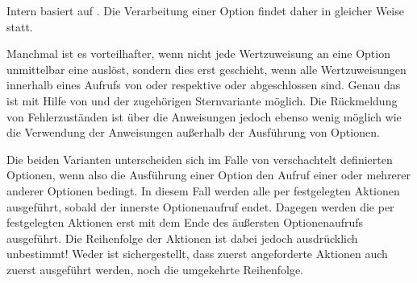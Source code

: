 \iffalse%
Die\ChangedAt{v3.27}{\Package{scrbase}} Verarbeitung einer Option
\Option{@else@} findet in derselben Weise statt wie bei
\DescRef{\LabelBase.cmd.FamilyOptions}.%
\else%
Intern basiert  auf
.
Die Verarbeitung einer Option
 findet daher in gleicher Weise statt.%
\fi%
\EndIndexGroup


\begin{Declaration}
\end{Declaration}
Manchmal ist es vorteilhafter, wenn nicht
jede Wertzuweisung an eine Option unmittelbar eine  auslöst,
sondern dies erst geschieht, wenn alle Wertzuweisungen innerhalb eines Aufrufs
von
oder
respektive  oder
 abgeschlossen
sind. Genau das ist mit Hilfe von  und der
zugehörigen Sternvariante möglich. Die
Rückmeldung von Fehlerzuständen ist über die Anweisungen jedoch ebenso wenig
möglich wie die Verwendung der Anweisungen außerhalb der Ausführung von
Optionen.

Die beiden Varianten unterscheiden sich im Falle von verschachtelt definierten
Optionen, wenn also die Ausführung einer Option den Aufruf einer oder mehrerer
anderer Optionen bedingt. In diesem Fall werden alle per
 festgelegten Aktionen ausgeführt, sobald der
innerste Optionenaufruf endet. Dagegen werden die per
 festgelegten Aktionen erst mit dem Ende des
äußersten Optionenaufrufs ausgeführt. Die Reihenfolge der
Aktionen ist dabei jedoch ausdrücklich unbestimmt! Weder ist sichergestellt,
dass zuerst angeforderte Aktionen auch zuerst ausgeführt werden, noch die
umgekehrte Reihenfolge.%
\EndIndexGroup


